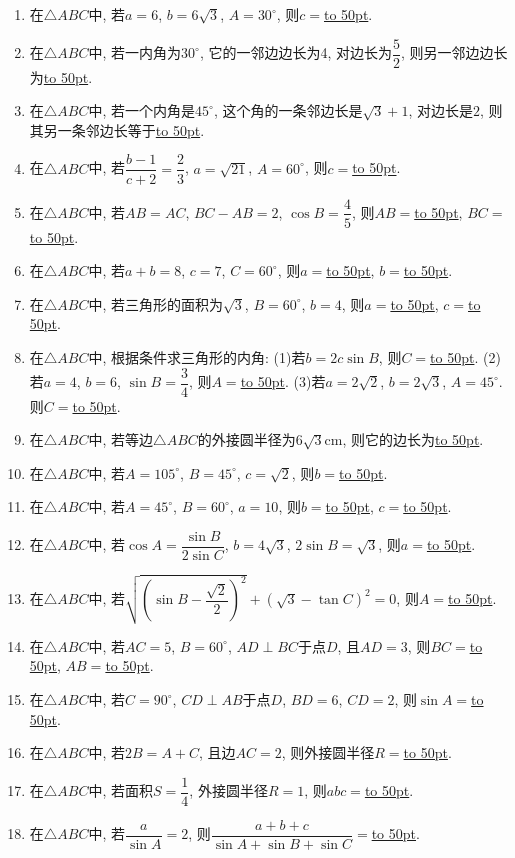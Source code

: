 \documentclass[10pt,a4paper]{article}
\newcommand{\blank}[1]{\underline{\hbox to #1pt{}}}
\begin{document}
\begin{enumerate}[1.]
\item 在$\triangle ABC$中, 若$a=6$, $b=6\sqrt 3$, $A=30^\circ$, 则$c=$\blank{50}.
\item 在$\triangle ABC$中, 若一内角为$30^\circ$, 它的一邻边边长为4, 对边长为$\dfrac 52$, 则另一邻边边长为\blank{50}.
\item 在$\triangle ABC$中, 若一个内角是$45^\circ$, 这个角的一条邻边长是$\sqrt 3+1$, 对边长是$2$, 则其另一条邻边长等于\blank{50}.
\item 在$\triangle ABC$中, 若$\dfrac{b-1}{c+2}=\dfrac 23$, $a=\sqrt {21}$, $A=60^{\circ}$, 则$c=$\blank{50}.
\item 在$\triangle ABC$中, 若$AB=AC$, $BC-AB=2$, $\cos B=\dfrac 45$, 则$AB=$\blank{50}, $BC=$\blank{50}.
\item 在$\triangle ABC$中, 若$a+b=8$, $c=7$, $C=60^{\circ}$, 则$a=$\blank{50}, $b=$\blank{50}.
\item 在$\triangle ABC$中, 若三角形的面积为$\sqrt 3$, $B=60^\circ$, $b=4$, 则$a=$\blank{50}, $c=$\blank{50}.
\item 在$\triangle ABC$中, 根据条件求三角形的内角:
(1)若$b=2c\sin B$, 则$C=$\blank{50}.
(2)若$a=4$, $b=6$, $\sin B=\dfrac 34$, 则$A=$\blank{50}.
(3)若$a=2\sqrt 2$, $b=2\sqrt 3$, $A=45^\circ$. 则$C=$\blank{50}.
\item 在$\triangle ABC$中, 若等边$\triangle ABC$的外接圆半径为$6\sqrt 3$cm, 则它的边长为\blank{50}.
\item 在$\triangle ABC$中, 若$A=105^\circ$, $B=45^\circ$, $c=\sqrt 2$, 则$b=$\blank{50}.
\item 在$\triangle ABC$中, 若$A=45^\circ$, $B=60^{\circ}$, $a=10$, 则$b=$\blank{50}, $c=$\blank{50}.
\item 在$\triangle ABC$中, 若$\cos A=\dfrac{\sin B}{2\sin C}$, $b=4\sqrt 3$, $2\sin B=\sqrt 3$, 则$a=$\blank{50}.
\item 在$\triangle ABC$中, 若$\sqrt {(\sin B-\dfrac{\sqrt 2}2)^2}+(\sqrt 3-\tan C)^2=0$, 则$A=$\blank{50}.
\item 在$\triangle ABC$中, 若$AC=5$, $B=60^{\circ}$, $AD\perp BC$于点$D$, 且$AD=3$, 则$BC=$\blank{50}, $AB=$\blank{50}.
\item 在$\triangle ABC$中, 若$C=90^{\circ}$, $CD\perp AB$于点$D$, $BD=6$, $CD=2$, 则$\sin A=$\blank{50}.
\item 在$\triangle ABC$中, 若$2B=A+C$, 且边$AC=2$, 则外接圆半径$R=$\blank{50}.
\item 在$\triangle ABC$中, 若面积$S=\dfrac 14$, 外接圆半径$R=1$, 则$abc=$\blank{50}.
\item 在$\triangle ABC$中, 若$\dfrac a{\sin A}=2$, 则$\dfrac{a+b+c}{\sin A+\sin B+\sin C}=$\blank{50}.

\end{enumerate}
\end{document}
